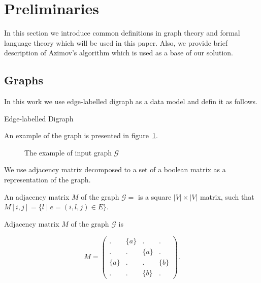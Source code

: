 \section{Preliminaries}

In this section we introduce common definitions in graph theory and formal language theory which will be used in this paper. 
Also, we provide brief description of Azimov's algorithm which is used as a base of our solution.

\subsection{Graphs}

In this work we use edge-labelled digraph as a data model and defin it as follows.
\begin{definition}
Edge-labelled Digraph
\end{definition}

An example of the graph is presented in figure~\ref{fig:example_input_graph}.

\begin{figure}[h]
    \centering        
    \caption{The example of input graph $\mathcal{G}$}
    \label{fig:example_input_graph}
\end{figure}

We use adjacency matrix decomposed to a set of a boolean matrix as a representation of the graph.
\begin{definition}
An adjacency matrix $M$ of the graph $\mathcal{G}=$ is a square $|V|\times|V|$ matrix, such that $M[i,j] = \{l \mid e = (i,l,j) \in E\}$.
\end{definition}

Adjacency matrix $M$ of the graph $\mathcal{G}$ is

$$
    M =
    \begin{pmatrix}
    . & \{a\} & . & .     \\
    . & . & \{a\} & .     \\
    \{a\} & . & . & \{b\} \\
    . & . & \{b\} & .
    \end{pmatrix}.
$$

